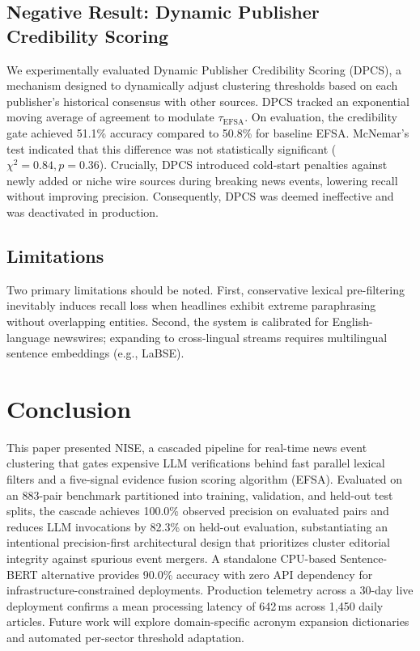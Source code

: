 \documentclass[conference]{IEEEtran}
\begin{document}
\subsection{Negative Result: Dynamic Publisher Credibility Scoring}
We experimentally evaluated Dynamic Publisher Credibility Scoring (DPCS), a mechanism designed to dynamically adjust clustering thresholds based on each publisher's historical consensus with other sources.
DPCS tracked an exponential moving average of agreement to modulate $\tau_{\text{EFSA}}$.
On evaluation, the credibility gate achieved 51.1\% accuracy compared to 50.8\% for baseline EFSA.
McNemar's test indicated that this difference was not statistically significant ($\chi^2 = 0.84, p = 0.36$).
Crucially, DPCS introduced cold-start penalties against newly added or niche wire sources during breaking news events, lowering recall without improving precision.
Consequently, DPCS was deemed ineffective and was deactivated in production.

\subsection{Limitations}
Two primary limitations should be noted.
First, conservative lexical pre-filtering inevitably induces recall loss when headlines exhibit extreme paraphrasing without overlapping entities.
Second, the system is calibrated for English-language newswires; expanding to cross-lingual streams requires multilingual sentence embeddings (e.g., LaBSE).

\section{Conclusion}

This paper presented NISE, a cascaded pipeline for real-time news event clustering that gates expensive LLM verifications behind fast parallel lexical filters and a five-signal evidence fusion scoring algorithm (EFSA).
Evaluated on an 883-pair benchmark partitioned into training, validation, and held-out test splits, the cascade achieves 100.0\% observed precision on evaluated pairs and reduces LLM invocations by 82.3\% on held-out evaluation, substantiating an intentional precision-first architectural design that prioritizes cluster editorial integrity against spurious event mergers.
A standalone CPU-based Sentence-BERT alternative provides 90.0\% accuracy with zero API dependency for infrastructure-constrained deployments.
Production telemetry across a 30-day live deployment confirms a mean processing latency of 642\,ms across 1,450 daily articles.
Future work will explore domain-specific acronym expansion dictionaries and automated per-sector threshold adaptation.
\end{document}
